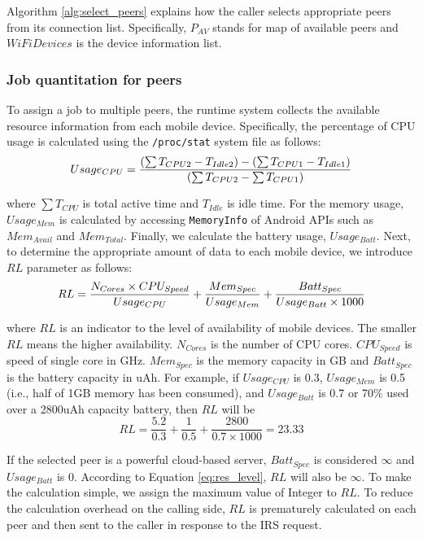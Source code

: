 \documentclass{sig-alternate}[10pt]
\begin{document}
Algorithm \ref{alg:select_peers} explains how the caller selects appropriate peers from its connection list. Specifically, $P_{AV}$ stands for map of available peers and $WiFiDevices$ is the device information list.\\

\subsubsection{Job quantitation for peers}\label{ss_jqfp}
To assign a job to multiple peers, the runtime system collects the available resource information from each mobile device. Specifically, the percentage of CPU usage is calculated using the \texttt{/proc/stat} system file as follows:
\begin{equation} 
\label{eq:cpu_usage} \small
Usage_{CPU} = \frac{(\sum{T_{CPU2}} - T_{Idle2}) - (\sum{T_{CPU1}} - T_{Idle1})}{(\sum{T_{CPU2}} - \sum{T_{CPU1}})}
\end{equation}

\noindent where $\sum{T_{CPU}}$ is total active time and $T_{Idle}$ is idle time. For the memory usage, $Usage_{Mem}$ is calculated by accessing \texttt{MemoryInfo} of Android APIs such as $Mem_{Avail}$ and $Mem_{Total}$. Finally, we  calculate the battery usage, $Usage_{Batt}$. Next, to determine the appropriate amount of data to each mobile device, we introduce $RL$ parameter as follows:
\begin{equation}
\label{eq:res_level}
\small
RL = \frac{N_{Cores} \times CPU_{Speed}}{Usage_{CPU}} + \frac{Mem_{Spec}}{Usage_{Mem}} + \frac{Batt_{Spec}}{Usage_{Batt} \times 1000}
\end{equation}

\noindent where $RL$ is an indicator to the level of availability of mobile devices. The smaller $RL$ means the higher availability. $N_{Cores}$ is the number of CPU cores. $CPU_{Speed}$ is speed of single core in GHz. $Mem_{Spec}$ is the memory capacity in GB and $Batt_{Spec}$ is the battery capacity in uAh. For example, if $Usage_{CPU}$ is 0.3, $Usage_{Mem}$ is 0.5 (i.e., half of 1GB memory has been consumed), and $Usage_{Batt}$ is 0.7 or 70\% used over a 2800uAh capacity battery, then $RL$ will be $$RL = \frac{5.2}{0.3} + \frac{1}{0.5} + \frac{2800}{0.7 \times 1000} = 23.33$$

If the selected peer is a powerful cloud-based server, $Batt_{Spec}$ is considered $\infty$ and $Usage_{Batt}$ is 0. According to Equation \ref{eq:res_level}, $RL$ will also be $\infty$. To make the calculation simple, we assign the maximum value of Integer to $RL$. To reduce the calculation overhead on the calling side, $RL$ is prematurely calculated on each peer and then sent to the caller in response to the IRS request.
\end{document}
